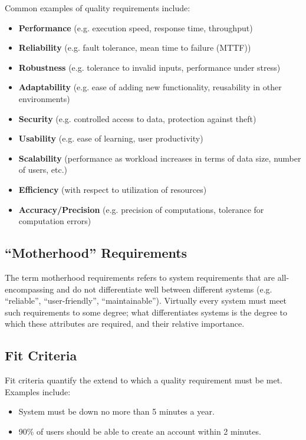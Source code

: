 \documentclass[12pt,titlepage]{article}
\begin{document}
    Common examples of quality requirements include:
    \begin{itemize}
      \item \textbf{Performance} (e.g. execution speed, response time, throughput)
      \item \textbf{Reliability} (e.g. fault tolerance, mean time to failure (MTTF))
      \item \textbf{Robustness} (e.g. tolerance to invalid inputs, performance under stress)
      \item \textbf{Adaptability} (e.g. ease of adding new functionality, reusability in other environments)
      \item \textbf{Security} (e.g. controlled access to data, protection against theft)
      \item \textbf{Usability} (e.g. ease of learning, user productivity)
      \item \textbf{Scalability} (performance as workload increases in terms of data size, number of users, etc.)
      \item \textbf{Efficiency} (with respect to utilization of resources)
      \item \textbf{Accuracy/Precision} (e.g. precision of computations, tolerance for computation errors)
    \end{itemize}

    \subsection{``Motherhood'' Requirements}
      The term motherhood requirements refers to system requirements that are all-encompassing and do not differentiate well between different systems
      (e.g. ``reliable'', ``user-friendly'', ``maintainable''). Virtually every system must meet such requirements to some degree; what differentiates
      systems is the degree to which these attributes are required, and their relative importance.

    \subsection{Fit Criteria}
      Fit criteria quantify the extend to which a quality requirement must be met. Examples include:
      \begin{itemize}
        \item System must be down no more than 5 minutes a year.
        \item 90\% of users should be able to create an account within 2 minutes.
      \end{itemize}
\end{document}
